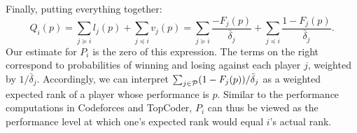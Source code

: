 Finally, putting everything together:
\[Q_i(p) = \sum_{j \succeq i} l_j(p) + \sum_{j \preceq i} v_j(p)
= \sum_{j \succeq i} \frac{-F_j(p)}{\bar\delta_j} + \sum_{j \preceq i} \frac{1 - F_j(p)}{\bar\delta_j}.\]
Our estimate for $P_i$ is the zero of this expression. The terms on the right correspond to probabilities of winning and losing against each player $j$, weighted by $1/\bar\delta_j$. Accordingly, we can interpret $\sum_{j\in \mathcal{P}} (1-F_j(p))/\bar\delta_j$ as a weighted expected rank of a player whose performance is $p$. Similar to the performance computations in Codeforces and TopCoder, $P_i$ can thus be viewed as the performance level at which one's expected rank would equal $i$'s actual rank.

